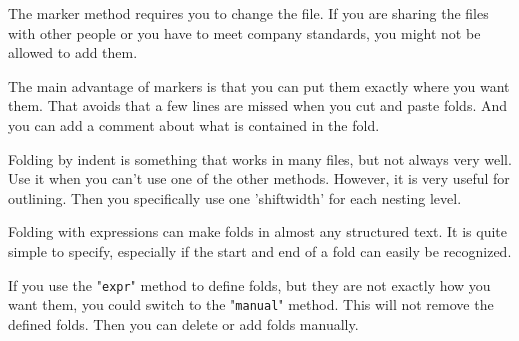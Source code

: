 The marker method requires you to change the file.
If you are sharing the files with other people or you have to meet company standards, you might not be allowed to add them.

The main advantage of markers is that you can put them exactly where you want them.
That avoids that a few lines are missed when you cut and paste folds.
And you can add a comment about what is contained in the fold.

Folding by indent is something that works in many files, but not always very well.
Use it when you can't use one of the other methods.
However, it is very useful for outlining.
Then you specifically use one 'shiftwidth' for each nesting level.

Folding with expressions can make folds in almost any structured text.
It is quite simple to specify, especially if the start and end of a fold can easily be recognized.

If you use the "\verb!expr!" method to define folds, but they are not exactly how you want them, you could switch to the "\verb!manual!" method.
This will not remove the defined folds.
Then you can delete or add folds manually.
\clearpage
